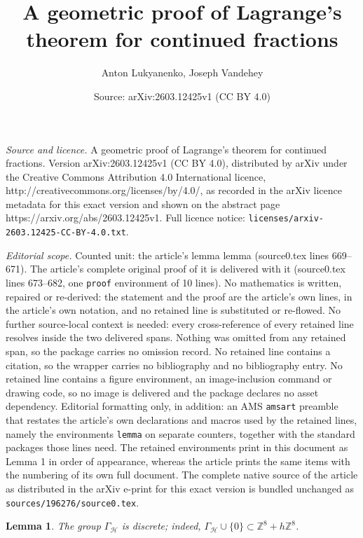 \documentclass[10pt,a4paper]{amsart}
\title{A geometric proof of Lagrange's theorem for continued fractions}
\author{Anton Lukyanenko, Joseph Vandehey}
\date{Source: arXiv:2603.12425v1 (CC BY 4.0)}
\newtheorem{lemma}{Lemma}
\begin{document}
\maketitle

\noindent\emph{Source and licence.} A geometric proof of Lagrange's theorem for continued fractions. Version arXiv:2603.12425v1 (CC BY 4.0), distributed by arXiv under the Creative Commons Attribution 4.0 International licence, http://creativecommons.org/licenses/by/4.0/, as recorded in the arXiv licence metadata for this exact version and shown on the abstract page https://arxiv.org/abs/2603.12425v1. Full licence notice: \texttt{licenses/arxiv-2603.12425-CC-BY-4.0.txt}.\par\smallskip

\noindent\textit{Editorial scope.} Counted unit: the article's lemma lemma (source0.tex lines 669--671). The article's complete original proof of it is delivered with it (source0.tex lines 673--682, one \texttt{proof} environment of 10 lines). No mathematics is written, repaired or re-derived: the statement and the proof are the article's own lines, in the article's own notation, and no retained line is substituted or re-flowed.  No further source-local context is needed: every cross-reference of every retained line resolves inside the two delivered spans.  Nothing was omitted from any retained span, so the package carries no omission record.  No retained line contains a citation, so the wrapper carries no bibliography and no bibliography entry.  No retained line contains a figure environment, an image-inclusion command or drawing code, so no image is delivered and the package declares no asset dependency.  Editorial formatting only, in addition: an AMS \texttt{amsart} preamble that restates the article's own declarations and macros used by the retained lines, namely the environments \texttt{lemma} on separate counters, together with the standard packages those lines need.  The retained environments print in this document as Lemma 1 in order of appearance, whereas the article prints the same items with the numbering of its own full document.  The complete native source of the article as distributed in the arXiv e-print for this exact version is bundled unchanged as \texttt{sources/196276/source0.tex}.
\begin{lemma} The group $\Gamma_\mathcal{H}$ is discrete; indeed, 
$\Gamma_\mathcal{H}\cup\{0\}\subset \mathbb{Z}^8 +h\mathbb{Z}^8$.
\end{lemma}
\end{document}
